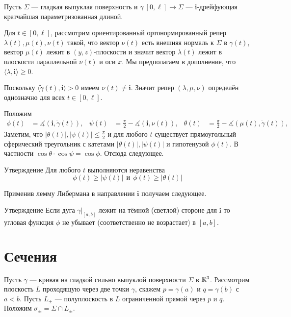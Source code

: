 \documentclass[a4paper,10pt]{article}
\begin{document}
Пусть $\Sigma$ --- гладкая выпуклая поверхность 
и $\gamma\:[0,\ell]\to \Sigma$ --- $\bm{i}$-дрейфующая кратчайшая 
параметризованная длиной.

Для $t\in [0,\ell]$, 
рассмотрим ориентированный ортонормированный репер $\lambda(t),\mu(t),\nu(t)$ 
такой, что вектор $\nu(t)$ есть внешняя нормаль к $\Sigma$ в $\gamma(t)$,
вектор $\mu(t)$ лежит в $(y,z)$-плоскости 
и значит вектор $\lambda(t)$ лежит в плоскости параллельной $\nu(t)$ и оси $x$.
Мы предполагаем в дополнение, что $\langle\lambda,\bm{i}\rangle\ge 0$.

Поскольку $\langle\dot\gamma(t),\bm{i}\rangle>0$ имеем 
$\nu(t)\ne\bm{i}$. 
Значит репер $(\lambda,\mu,\nu)$ определён однозначно для всех $t\in[0,\ell]$.

Положим
\begin{align*}
\phi(t)&=\measuredangle(\bm{i},\dot\gamma(t)),&
\psi(t)&=\tfrac\pi2-\measuredangle(\bm{i},\nu(t)),&
\theta(t)&=\tfrac\pi2-\measuredangle(\mu(t),\dot\gamma(t)),
\end{align*}
Заметим, что $|\theta(t)|,|\psi(t)|\le \tfrac\pi2$ 
и для любого $t$ существует прямоугольный сферический треугольник с катетами $|\theta(t)|,|\psi(t)|$ и гипотенузой $\phi(t)$.
В частности $\cos\theta\cdot\cos\psi=\cos\phi$.
Отсюда следующее.

\begin{thm}{Утверждение}\label{clm:alpha-phi-psi}
Для любого $t$ выполняются неравенства 
\[
\phi(t)\ge |\psi(t)|\ \ \text{и}\ \ \phi(t)\ge |\theta(t)|
\]

\end{thm}

Применив лемму Либермана в направлении $\bm{i}$ получаем следующее.

\begin{thm}{Утверждение}\label{clm:7.3}
Если дуга $\gamma|_{[a,b]}$ лежит на тёмной (светлой) стороне для $\bm{i}$ 
то угловая функция $\phi$ не убывает (соответственно не возрастает) в $[a,b]$.
\end{thm}

\section{Сечения}

Пусть $\gamma$ --- кривая на гладкой сильно выпуклой поверхности $\Sigma$ в $\mathbb{R}^3$.
Рассмотрим плоскость $L$ 
проходящую через две точки $\gamma$, 
скажем $p=\gamma(a)$ и $q=\gamma(b)$ с $a<b$.
Пусть $L_\pm$ --- полуплоскость в $L$ ограниченной прямой через $p$ и $q$.
Положим $\sigma_\pm=\Sigma\cap L_\pm$.
\end{document}
